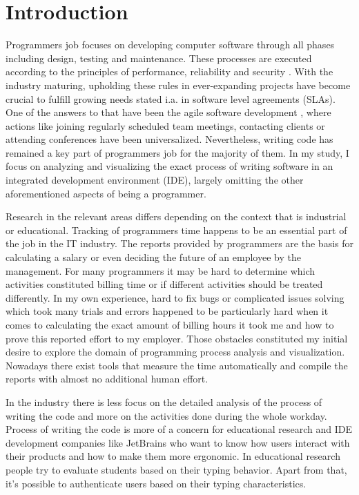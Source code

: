 \chapter{Introduction}

Programmers job focuses on developing computer software through all phases including design, testing and maintenance. These processes are executed according to the principles of performance, reliability and security \cite{Sto21ProgrammersDo}. With the industry maturing, upholding these rules in ever-expanding projects have become crucial to fulfill growing needs stated i.a. in software level agreements (SLAs). One of the answers to that have been the agile software development \cite{Gro21SDMHistory}, where actions like joining regularly scheduled team meetings, contacting clients or attending conferences have been universalized. Nevertheless, writing code has remained a key part of programmers job for the majority of them. In my study, I focus on analyzing and visualizing the exact process of writing software in an integrated development environment (IDE), largely omitting the other aforementioned aspects of being a programmer.

Research in the relevant areas differs depending on the context that is industrial or educational. Tracking of programmers time happens to be an essential part of the job in the IT industry. The reports provided by programmers are the basis for calculating a salary or even deciding the future of an employee by the management. For many programmers it may be hard to determine which activities constituted billing time or if different activities should be treated differently. In my own experience, hard to fix bugs or complicated issues solving which took many trials and errors happened to be particularly hard when it comes to calculating the exact amount of billing hours it took me and how to prove this reported effort to my employer. Those obstacles constituted my initial desire to explore the domain of programming process analysis and visualization. Nowadays there exist tools that measure the time automatically and compile the reports with almost no additional human effort.

In the industry there is less focus on the detailed analysis of the process of writing the code and more on the activities done during the whole workday. Process of writing the code is more of a concern for educational research and IDE development companies like JetBrains who want to know how users interact with their products and how to make them more ergonomic. In educational research people try to evaluate students based on their typing behavior. Apart from that, it's possible to authenticate users based on their typing characteristics.

